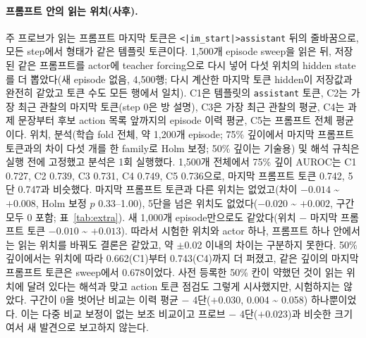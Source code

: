 \documentclass[11pt]{article}
\begin{document}
\paragraph{프롬프트 안의 읽는 위치(사후).} 주 프로브가 읽는 프롬프트 마지막 토큰은 \texttt{<|im\_start|>assistant} 뒤의 줄바꿈으로, 모든 step에서 형태가 같은 템플릿 토큰이다. 1,500개 episode sweep을 읽은 뒤, 저장된 같은 프롬프트를 actor에 teacher forcing으로 다시 넣어 다섯 위치의 hidden state를 더 뽑았다(새 episode 없음, 4,500행; 다시 계산한 마지막 토큰 hidden이 저장값과 완전히 같았고 토큰 수도 모든 행에서 일치). C1은 템플릿의 \texttt{assistant} 토큰, C2는 가장 최근 관찰의 마지막 토큰(step 0은 방 설명), C3은 가장 최근 관찰의 평균, C4는 과제 문장부터 후보 action 목록 앞까지의 episode 이력 평균, C5는 프롬프트 전체 평균이다. 위치, 분석(학습 fold 전체, 약 1,200개 episode; 75\% 깊이에서 마지막 프롬프트 토큰과의 차이 다섯 개를 한 family로 Holm 보정; 50\% 깊이는 기술용) 및 해석 규칙은 실행 전에 고정했고 분석은 1회 실행했다. 1,500개 전체에서 75\% 깊이 AUROC는 C1 0.727, C2 0.739, C3 0.731, C4 0.749, C5 0.736으로, 마지막 프롬프트 토큰 0.742, 5단 0.747과 비슷했다. 마지막 프롬프트 토큰과 다른 위치는 없었고(차이 $-0.014$ \textasciitilde{} $+0.008$, Holm 보정 $p$ 0.33--1.00), 5단을 넘은 위치도 없었다($-0.020$ \textasciitilde{} $+0.002$, 구간 모두 0 포함; 표~\ref{tab:extra}). 새 1,000개 episode만으로도 같았다(위치 $-$ 마지막 프롬프트 토큰 $-0.010$ \textasciitilde{} $+0.013$). 따라서 시험한 위치와 actor 하나, 프롬프트 하나 안에서는 읽는 위치를 바꿔도 결론은 같았고, 약 $\pm$0.02 이내의 차이는 구분하지 못한다. 50\% 깊이에서는 위치에 따라 0.662(C1)부터 0.743(C4)까지 더 퍼졌고, 같은 깊이의 마지막 프롬프트 토큰은 sweep에서 0.678이었다. 사전 등록한 50\% 칸이 약했던 것이 읽는 위치에 달려 있다는 해석과 맞고 action 토큰 점검도 그렇게 시사했지만, 시험하지는 않았다. 구간이 0을 벗어난 비교는 이력 평균 $-$ 4단($+0.030$, 0.004 \textasciitilde{} 0.058) 하나뿐이었다. 이는 다중 비교 보정이 없는 보조 비교이고 프로브 $-$ 4단($+0.023$)과 비슷한 크기여서 새 발견으로 보고하지 않는다.
\end{document}
